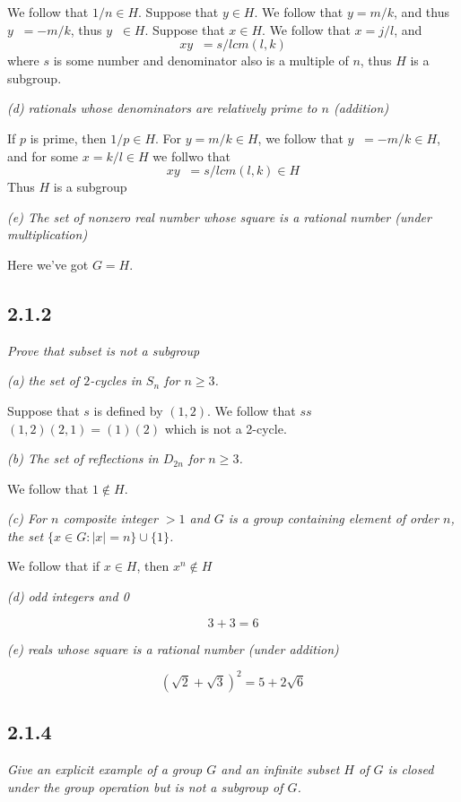 \documentclass[11pt,oneside,titlepage]{book}
\DeclareMathOperator \inv {^{-1}}
\begin{document}
We follow that $1/n \in H$. Suppose that $y \in H$. We follow that $y = m/k$, and thus
$y\inv = -m/k$, thus $y\inv \in H$. Suppose that $x \in H$. We follow that $x = j/l$,
and
$$xy\inv = s/ lcm(l, k)$$
where $s$ is some number and denominator also is a multiple of $n$, thus $H$ is a subgroup.

\textit{(d) rationals whose denominators are relatively prime to $n$ (addition)}

If $p$ is prime, then $1/p \in H$. For $y = m/k \in H$, we follow that $y \inv = -m/k \in H$,
and for some $x = k/l \in H$ we follwo that
$$xy\inv = s/lcm(l, k) \in H$$
Thus $H$ is a subgroup

\textit{(e) The set of nonzero real number whose square is a
  rational number (under multiplication)}

Here we've got $G = H$.


\subsection*{2.1.2}

\textit{Prove that subset is not a subgroup}

\textit{(a) the set of $2$-cycles in $S_n$ for $n \geq 3$.}

Suppose that $s$ is defined by  $(1, 2)$. We follow that $s s \inv$ 
$(1, 2) (2, 1) = (1)(2)$
which is not a 2-cycle.

\textit{(b) The set of reflections in $D_{2n}$ for $n \geq 3$.}

We follow that $1 \notin H$.

\textit{(c) For $n$ composite integer $> 1$ and $G$ is a group containing element of order $n$,
  the set $\{x \in G: |x| = n\} \cup \{1\}$.}

We follow that if $x \in H$, then $x^{n} \notin H$

\textit{(d) odd integers and 0}

$$3 + 3 = 6$$

\textit{(e) reals whose square is a rational number (under addition)}

$$(\sqrt{2} + \sqrt{3})^2 = 5 + 2\sqrt{6}$$

\subsection*{2.1.4}

\textit{Give an explicit example of a group $G$ and an infinite subset $H$ of $G$ is closed
  under the group operation but is not a subgroup of $G$.}
\end{document}
